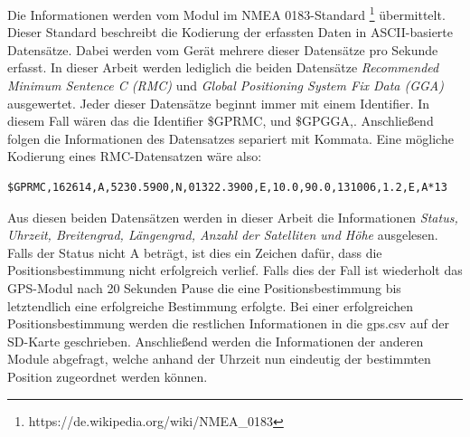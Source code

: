 \documentclass[a4paper,11pt, ngerman]{scrartcl}
\begin{document}
Die Informationen werden vom Modul im NMEA 0183-Standard \footnote{https://de.wikipedia.org/wiki/NMEA\_0183} übermittelt. Dieser Standard beschreibt die Kodierung der erfassten Daten in ASCII-basierte Datensätze. Dabei werden vom Gerät mehrere dieser Datensätze pro Sekunde erfasst. In dieser Arbeit werden lediglich die beiden Datensätze \textit{Recommended Minimum Sentence C (RMC)} und \textit{Global Positioning System Fix Data (GGA)} ausgewertet. Jeder dieser Datensätze beginnt immer mit einem Identifier. In diesem Fall wären das die Identifier \grqq \$GPRMC,\grqq{} und \grqq \$GPGGA,\grqq{}. Anschließend folgen die Informationen des Datensatzes separiert mit Kommata. Eine mögliche Kodierung eines RMC-Datensatzen wäre also:
\begin{lstlisting}
$GPRMC,162614,A,5230.5900,N,01322.3900,E,10.0,90.0,131006,1.2,E,A*13
\end{lstlisting}
Aus diesen beiden Datensätzen werden in dieser Arbeit die Informationen \textit{Status, Uhrzeit, Breitengrad, Längengrad, Anzahl der Satelliten und Höhe} ausgelesen. Falls der Status nicht \grqq A\grqq{} beträgt, ist dies ein Zeichen dafür, dass die Positionsbestimmung nicht erfolgreich verlief. Falls dies der Fall ist wiederholt das GPS-Modul nach 20 Sekunden Pause die eine Positionsbestimmung bis letztendlich eine erfolgreiche Bestimmung erfolgte. Bei einer erfolgreichen Positionsbestimmung werden die restlichen Informationen in die \grqq gps.csv\grqq{} auf der SD-Karte geschrieben. Anschließend werden die Informationen der anderen Module abgefragt, welche anhand der Uhrzeit nun eindeutig der bestimmten Position zugeordnet werden können.
\end{document}
